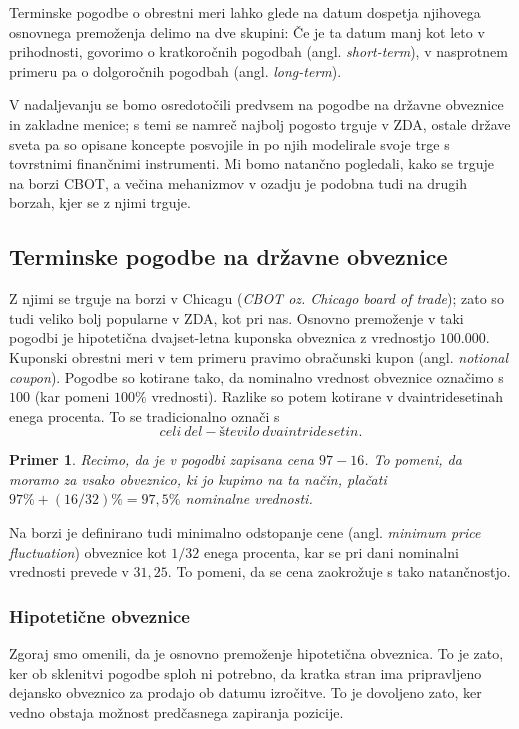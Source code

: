 \documentclass[a4paper, 11pt]{article}
\newtheorem{primer}{Primer}
\begin{document}
Terminske pogodbe o obrestni meri lahko glede na datum dospetja njihovega osnovnega premoženja delimo na 
dve skupini: Če je ta datum manj kot leto v prihodnosti, govorimo o kratkoročnih pogodbah (angl. 
\textit{short-term}), v nasprotnem primeru pa o dolgoročnih pogodbah (angl. \textit{long-term}). 

V nadaljevanju se bomo osredotočili predvsem na pogodbe na državne obveznice in zakladne menice; s temi
se namreč najbolj pogosto trguje v ZDA, ostale države sveta pa so opisane koncepte posvojile in po njih
modelirale svoje trge s tovrstnimi finančnimi instrumenti. Mi bomo natančno pogledali, kako se trguje na
borzi CBOT, a večina mehanizmov v ozadju je podobna tudi na drugih borzah, kjer se z njimi trguje.

\subsection{Terminske pogodbe na državne obveznice}
Z njimi se trguje na borzi v Chicagu (\textit{CBOT oz. Chicago board of trade}); zato so tudi veliko 
bolj popularne v ZDA, kot pri nas. Osnovno premoženje v taki pogodbi je hipotetična dvajset-letna 
kuponska obveznica z vrednostjo \textdollar$100.000$. Kuponski obrestni meri v tem primeru pravimo 
obračunski kupon (angl. \textit{notional coupon}). Pogodbe so kotirane tako, da nominalno vrednost 
obveznice označimo s $100$ (kar pomeni $100\%$ vrednosti). Razlike so potem kotirane v dvaintridesetinah 
enega procenta. To se tradicionalno označi s 
%
$$ celi\:del - število\:dvaintridesetin. $$
%

\begin{primer}
    Recimo, da je v pogodbi zapisana cena $97-16$. To pomeni, da moramo za vsako obveznico, ki jo kupimo 
    na ta način, plačati $97\% + (16/32)\% = 97,5\%$ nominalne vrednosti. 
\end{primer}

Na borzi je definirano tudi minimalno odstopanje cene (angl. \textit{minimum price fluctuation}) obveznice
kot $1/32$ enega procenta, kar se pri dani nominalni vrednosti prevede v \textdollar$31,25.$ To pomeni, da
se cena zaokrožuje s tako natančnostjo.

\subsubsection{Hipotetične obveznice}
Zgoraj smo omenili, da je osnovno premoženje hipotetična obveznica. To je zato, ker ob sklenitvi pogodbe 
sploh ni potrebno, da kratka stran ima pripravljeno dejansko obveznico za prodajo ob datumu izročitve.
To je dovoljeno zato, ker vedno obstaja možnost predčasnega zapiranja pozicije. 
\end{document}
